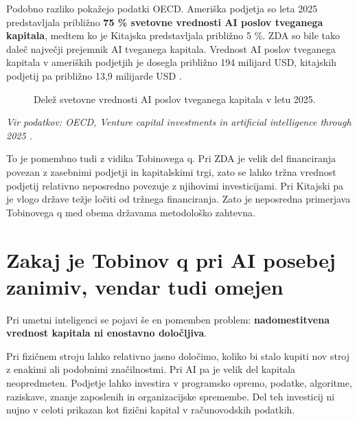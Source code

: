 \documentclass[12pt,a4paper]{article}
\begin{document}
Podobno razliko pokažejo podatki OECD. Ameriška podjetja so leta 2025 predstavljala približno \textbf{75 \% svetovne vrednosti AI poslov tveganega kapitala}, medtem ko je Kitajska predstavljala približno 5 \%. ZDA so bile tako daleč največji prejemnik AI tveganega kapitala. Vrednost AI poslov tveganega kapitala v ameriških podjetjih je dosegla približno 194 milijard USD, kitajskih podjetij pa približno 13,9 milijarde USD \citep{OECD2026}.

\begin{figure}[htbp]
\centering
{}
\caption{Delež svetovne vrednosti AI poslov tveganega kapitala v letu 2025.}
\label{fig:vc_share}
\end{figure}

\noindent
\textit{Vir podatkov: OECD, \textit{Venture capital investments in artificial intelligence through 2025} \citep{OECD2026}.}

To je pomembno tudi z vidika Tobinovega q. Pri ZDA je velik del financiranja povezan z zasebnimi podjetji in kapitalskimi trgi, zato se lahko tržna vrednost podjetij relativno neposredno povezuje z njihovimi investicijami. Pri Kitajski pa je vlogo države težje ločiti od tržnega financiranja. Zato je neposredna primerjava Tobinovega q med obema državama metodološko zahtevna.


\section{Zakaj je Tobinov q pri AI posebej zanimiv, vendar tudi omejen}

Pri umetni inteligenci se pojavi še en pomemben problem: \textbf{nadomestitvena vrednost kapitala ni enostavno določljiva}.

Pri fizičnem stroju lahko relativno jasno določimo, koliko bi stalo kupiti nov stroj z enakimi ali podobnimi značilnostmi. Pri AI pa je velik del kapitala neopredmeten. Podjetje lahko investira v programsko opremo, podatke, algoritme, raziskave, znanje zaposlenih in organizacijske spremembe. Del teh investicij ni nujno v celoti prikazan kot fizični kapital v računovodskih podatkih.
\end{document}
